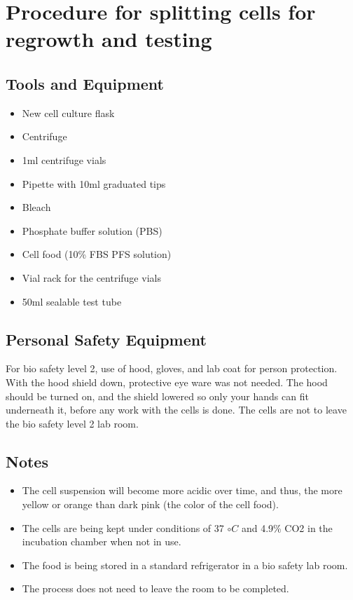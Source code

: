\documentclass[journal]{IEEEtran}
\begin{document}
\section{Procedure for splitting cells for regrowth and testing}
\subsection{Tools and Equipment}
\begin{itemize}
\item New cell culture flask
\item Centrifuge
\item 1ml centrifuge vials 
\item Pipette with 10ml graduated tips
\item Bleach
\item Phosphate buffer solution (PBS)
\item Cell food (10\% FBS PFS solution)
\item Vial rack for the centrifuge vials
\item 50ml sealable test tube
\end{itemize}

\subsection{Personal Safety Equipment}
For bio safety level 2, use of hood, gloves, and lab coat for person protection. With the hood shield down, protective eye ware was not needed. The hood should be turned on, and the shield lowered so only your hands can fit underneath it,  before any work with the cells is done. The cells are not to leave the bio safety level 2 lab room.

\subsection{Notes}
\begin{itemize}
\item The cell suspension will become more acidic over time, and thus, the more yellow or orange than dark pink (the color of the cell food).
\item The cells are being kept under conditions of 37 $\circ C$ and 4.9\% CO2 in the incubation chamber when not in use. 
\item The food is being stored in a standard refrigerator in a bio safety lab room.
\item The process does not need to leave the room to be completed.
\end{itemize}
\end{document}
